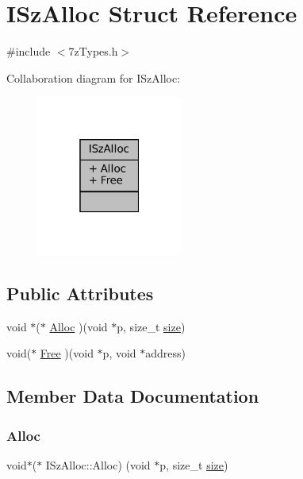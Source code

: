 \hypertarget{struct_i_sz_alloc}{}\section{I\+Sz\+Alloc Struct Reference}
\label{struct_i_sz_alloc}


{\ttfamily \#include $<$7z\+Types.\+h$>$}



Collaboration diagram for I\+Sz\+Alloc\+:
\nopagebreak
\begin{figure}[H]
\begin{center}
\leavevmode
\includegraphics[width=135pt]{struct_i_sz_alloc__coll__graph}
\end{center}
\end{figure}
\subsection*{Public Attributes}
\begin{DoxyCompactItemize}
\item 
void $\ast$($\ast$ \mbox{\hyperlink{struct_i_sz_alloc_a3614ce5007ec901d919c461f3a7bdae4}{Alloc}} )(void $\ast$p, size\+\_\+t \mbox{\hyperlink{ioapi_8h_a014d89bd76f74ef3a29c8f04b473eb76}{size}})
\item 
void($\ast$ \mbox{\hyperlink{struct_i_sz_alloc_a3a92ced27cca6cd4c948cbf9dfe4d700}{Free}} )(void $\ast$p, void $\ast$address)
\end{DoxyCompactItemize}


\subsection{Member Data Documentation}
\mbox{\label{struct_i_sz_alloc_a3614ce5007ec901d919c461f3a7bdae4}} 
\subsubsection{\texorpdfstring{Alloc}{Alloc}}
{\footnotesize\ttfamily void$\ast$($\ast$ I\+Sz\+Alloc\+::\+Alloc) (void $\ast$p, size\+\_\+t \mbox{\hyperlink{ioapi_8h_a014d89bd76f74ef3a29c8f04b473eb76}{size}})}

